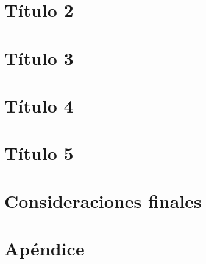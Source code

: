 \documentclass[a4paper, 12pt, twoside]{report} %
\begin{document}
\chapter{Título 2}\label{doc-cap2}


\chapter{Título 3}\label{doc-cap3}


\chapter{Título 4}\label{doc-cap4}


\chapter{Título 5}\label{doc-cap5}


\chapter{Consideraciones finales}\label{doc-conclusiones}



\newpage
\chapter*{Apéndice}
\setcounter{section}{0}



%


\listoffigures
{}
 
\listoftables
{}

\printindex
\end{document}
